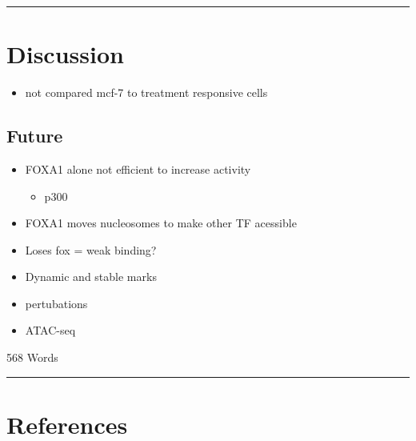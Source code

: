 \documentclass[
  12pt,
]{article}
\providecommand{\tightlist}{%
  \setlength{\itemsep}{0pt}\setlength{\parskip}{0pt}}
\begin{document}
\begin{center}\rule{0.5\linewidth}{0.5pt}\end{center}

\hypertarget{discussion}{%
\section{Discussion}\label{discussion}}

\begin{itemize}
\tightlist
\item
  not compared mcf-7 to treatment responsive cells
\end{itemize}

\hypertarget{future}{%
\subsection{Future}\label{future}}

\begin{itemize}
\item
  FOXA1 alone not efficient to increase activity

  \begin{itemize}
  \tightlist
  \item
    p300
  \end{itemize}
\item
  FOXA1 moves nucleosomes to make other TF acessible
\item
  Loses fox = weak binding?
\item
  Dynamic and stable marks
\item
  pertubations
\end{itemize}

\begin{itemize}
\tightlist
\item
  ATAC-seq
\end{itemize}

\begin{flushright}
568 Words
\end{flushright}

\begin{center}\rule{0.5\linewidth}{0.5pt}\end{center}

\hypertarget{references}{%
\section*{References}\label{references}}
\end{document}
